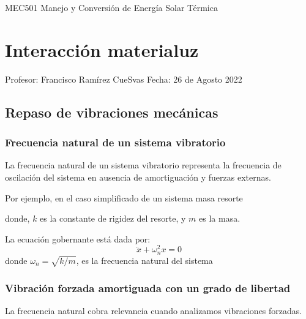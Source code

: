 \documentclass[letterpaper,10pt,english]{jupyterBook}
\let\sphinxpxdimen\pdfpxdimen\else\newdimen\sphinxpxdimen
\begin{document}
\sphinxstepscope

\sphinxAtStartPar
MEC501 \sphinxhyphen{} Manejo y Conversión de Energía Solar Térmica


\chapter{Interacción materia\sphinxhyphen{}luz}
\label{\detokenize{3_Interacci_xf3n_materia-luz/3_Interacci_xf3n_materia-luz:interaccion-materia-luz}}\label{\detokenize{3_Interacci_xf3n_materia-luz/3_Interacci_xf3n_materia-luz::doc}}
\sphinxAtStartPar

Profesor: Francisco Ramírez CueSvas
Fecha: 26 de Agosto 2022


\section{Repaso de vibraciones mecánicas}
\label{\detokenize{3_Interacci_xf3n_materia-luz/3_Interacci_xf3n_materia-luz:repaso-de-vibraciones-mecanicas}}

\subsection{Frecuencia natural de un sistema vibratorio}
\label{\detokenize{3_Interacci_xf3n_materia-luz/3_Interacci_xf3n_materia-luz:frecuencia-natural-de-un-sistema-vibratorio}}
\sphinxAtStartPar
La frecuencia natural de un sistema vibratorio representa la frecuencia de oscilación del sistema en ausencia de amortiguación y fuerzas externas.

\sphinxAtStartPar
Por ejemplo, en el caso simplificado de un sistema masa resorte

\noindent{\hspace*{\fill}\sphinxincludegraphics[width=250\sphinxpxdimen]{{free_sistem_one_degree}.png}\hspace*{\fill}}

\sphinxAtStartPar
donde, \(k\) es la constante de rigidez del resorte, y \(m\) es la masa.

\sphinxAtStartPar
La ecuación gobernante está dada por:
\begin{equation*}
\ddot{x} + \omega_n^2 x = 0 
\end{equation*}
\sphinxAtStartPar
donde \(\omega_n = \sqrt{k/m}\), es la frecuencia natural del sistema


\subsection{Vibración forzada amortiguada con un grado de libertad}
\label{\detokenize{3_Interacci_xf3n_materia-luz/3_Interacci_xf3n_materia-luz:vibracion-forzada-amortiguada-con-un-grado-de-libertad}}
\sphinxAtStartPar
La frecuencia natural cobra relevancia cuando analizamos vibraciones forzadas.
\end{document}
